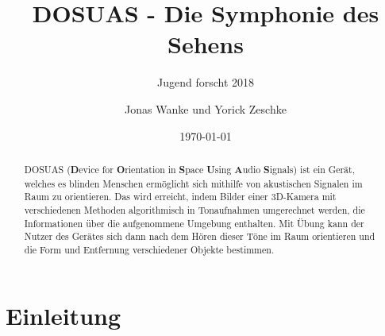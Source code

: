 \documentclass[a4paper,12pt,ngerman]{scrartcl}
\title{DOSUAS - Die Symphonie des Sehens}
\subtitle{Jugend forscht 2018}
\author{Jonas Wanke und Yorick Zeschke}
\date{\today}
\begin{document}
\maketitle


\begin{abstract}
	DOSUAS (\textbf{D}evice for \textbf{O}rientation in \textbf{S}pace \textbf{U}sing 
	\textbf{A}udio \textbf{S}ignals) ist ein Gerät, welches es blinden Menschen ermöglicht
	sich mithilfe von akustischen Signalen im Raum zu orientieren. Das wird erreicht, indem Bilder 
	einer 3D-Kamera mit verschiedenen Methoden algorithmisch in Tonaufnahmen umgerechnet werden,
	die Informationen über die aufgenommene Umgebung enthalten. Mit Übung kann der Nutzer des Gerätes 
	sich dann nach dem Hören dieser Töne im Raum orientieren und die Form und Entfernung verschiedener 
	Objekte bestimmen.
\end{abstract}

\tableofcontents

\newpage

\section{Einleitung}
\end{document}
